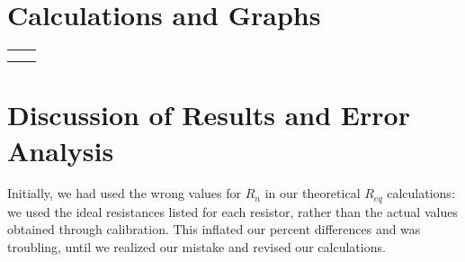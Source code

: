 \documentclass[12pt,letterpaper,titlepage]{report}
\begin{document}
\bigskip
\bigskip



\pagebreak
\section*{Calculations and Graphs}

\begin{minipage}{\linewidth}
    \centering
    \bigskip    
    
    \begin{tabular}{c c}

        
        \begin{minipage}{.45\linewidth}
            \centering
            Calculated Resistances \\
            \bigskip
            
            \bigskip
            \bigskip %
            \bigskip %
            \bigskip %
            \bigskip %
            \bigskip %
            \bigskip
            \medskip %
            \bigskip
        \end{minipage} &
        
        
        \begin{minipage}{.5\linewidth}
            \centering
            
        \end{minipage}

    \end{tabular}    
\end{minipage}



\section*{Discussion of Results and Error Analysis}

Initially, we had used the wrong values for $R_n$ in our theoretical $R_{eq}$ calculations: we used the ideal resistances listed for each resistor, rather than the actual values obtained through calibration. This inflated our percent differences and was troubling, until we realized our mistake and revised our calculations.

\medskip

\end{document}
